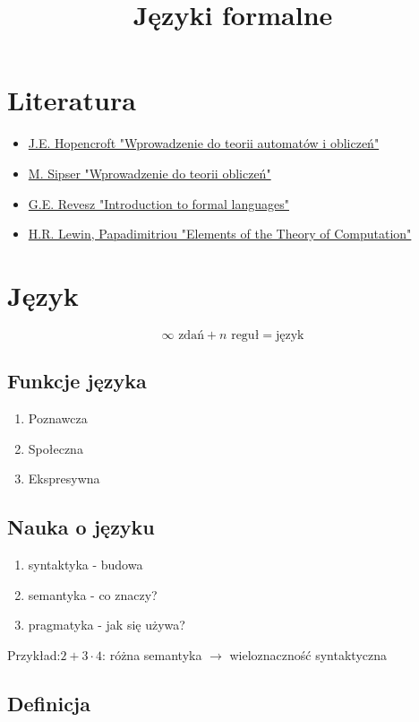 \documentclass{../notatki}
\title{Języki formalne}
\begin{document}
\tableofcontents

\section{Literatura}

\begin{itemize}
    \item \href{}{J.E. Hopencroft "Wprowadzenie do teorii automatów i obliczeń"}
    \item \href{}{M. Sipser "Wprowadzenie do teorii obliczeń"}
    \item \href{}{G.E. Revesz "Introduction to formal languages"}
    \item \href{}{H.R. Lewin, Papadimitriou "Elements of the Theory of Computation"}
\end{itemize}

\section{Język}

$$
\infty \text{ zdań} + n \text{ reguł} = \text{język}
$$

\subsection{Funkcje języka}

\begin{enumerate}
    \item Poznawcza
    \item Społeczna
    \item Ekspresywna
\end{enumerate}

\subsection{Nauka o języku}

\begin{enumerate}
    \item syntaktyka - budowa
    \item semantyka - co znaczy?
    \item pragmatyka - jak się używa?
\end{enumerate}
Przykład:$2 + 3 \cdot 4$: różna semantyka $\rightarrow$ wieloznaczność syntaktyczna

\subsection{Definicja}
\end{document}
